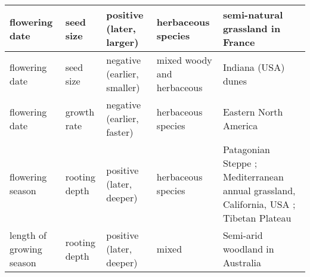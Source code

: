 \documentclass[11pt,a4paper,oneside]{article}
\begin{document}
\begin{center}
\begin{table}
\begin{minipage}{16cm}
\begin{tabular}{ | p{2cm} |  p{2.5 cm} | p{2.5 cm} | p{2.5 cm} | p{5cm} | }
flowering date & seed size & positive (later, larger) & herbaceous species & semi-natural grassland in France \citep{Vile:2006nc} \\ \hline
flowering date & seed size & negative (earlier, smaller) & mixed woody and herbaceous & Indiana (USA) dunes \citep{Mazer:1989in} \\ \hline
flowering date	& growth rate & negative (earlier, faster)	& herbaceous species & Eastern North America \citep{Sun:2011eu} \\ \hline
flowering season & rooting depth & positive (later, deeper) & herbaceous species & Patagonian Steppe \citep{Golluscio:1993xi}; Mediterranean annual grassland, California, USA \citep{Gulmon1983}; Tibetan Plateau \citep{Dorji2013} \\ \hline
length of growing season & rooting depth & positive (later, deeper) & mixed & Semi-arid woodland in Australia \citep{Campanella2008} \\ \hline
\end{tabular}
\vspace{-0.75\skip\footins}
   \renewcommand{\footnoterule}{}
  \end{minipage}
\end{table}
\end{center}
\end{document}
